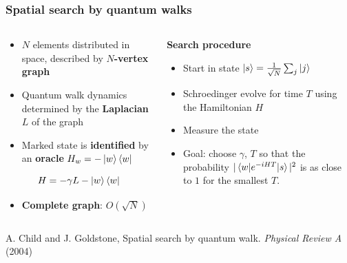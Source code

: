 \documentclass{beamer}
\newcommand{\bb}[1]{\textbf{\textcolor{darkish_blue}{#1}}}
\begin{document}
\begin{frame}
\frametitle{Spatial search by quantum walks}

\begin{columns}
	\begin{column}[T]{0.50\textwidth}
		\begin{itemize}
			\item $N$ elements distributed in space, described by \bb{$N$-vertex graph} 
			\item Quantum walk dynamics determined by the \bb{Laplacian} $L$ of the graph 
			\item Marked state is \bb{identified} by an \bb{oracle} $ H_w = -\ket{w}\bra{w}$ 
		\end{itemize}

		\vspace{0.3cm}
		\centering
		\begin{tcolorbox}[width=4.0cm, colframe=darkblue, colback=white, halign=center, left=1pt, right=1pt, top=-11pt, bottom=1pt]
			\begin{equation*}
				H=-\gamma L -\ket{w}\bra{w}
			\end{equation*}
		\end{tcolorbox}



		\vspace{0.5cm}
		\begin{itemize}
			\item \bb{Complete graph}: $O(\sqrt{N})$
		\end{itemize}
	\end{column}

	\begin{column}[T]{0.4\textwidth}
	\vspace{-0.2cm}
	\begin{tcolorbox}[width=5.0cm, colframe=darkblue, colback=white, halign=center, left=1pt, right=1pt]
	\centering
	\bb{Search procedure}
		\begin{itemize}
			\item Start in state $\ket{s} = \frac{1}{\sqrt{N}}\sum_{j}\ket{j}$
			\item Schroedinger evolve for time $T$ using the Hamiltonian $H$
			\item Measure the state
			\item Goal: choose $\gamma$, $T$ so that the probability $|\braket{w|e^{-iHT}|s}|^2$ is as close to $1$ for the smallest $T$.
		\end{itemize}
	\end{tcolorbox}
	\end{column}

\end{columns}

\vspace{0.5cm}
\footnotesize A. Child and J. Goldstone, Spatial search by quantum walk. \textit{Physical Review A} (2004)
\end{frame}
\end{document}
